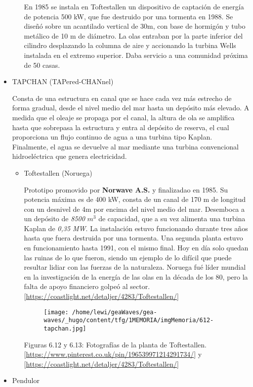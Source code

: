 \documentclass[]{article}
\begin{document}
\begin{itemize}
\begin{itemize}
    En 1985 se instala en Toftestallen un dispositivo de captación de
    energía de potencia 500 kW, que fue destruido por una tormenta en
    1988. Se diseñó sobre un acantilado vertical de 30m, con base de
    hormigón y tubo metálico de 10 m de diámetro. La olas entraban por
    la parte inferior del cilindro desplazando la columna de aire y
    accionando la turbina Wells instalada en el extremo superior. Daba
    servicio a una comunidad próxima de 50 casas.
  \end{itemize}
\item
  TAPCHAN (TAPered-CHANnel)

  Consta de una estructura en canal que se hace cada vez más estrecho de
  forma gradual, desde el nivel medio del mar hasta un depósito más
  elevado. A medida que el oleaje se propaga por el canal, la altura de
  ola se amplifica hasta que sobrepasa la estructura y entra al depósito
  de reserva, el cual proporciona un flujo continuo de agua a una
  turbina tipo Kaplan. Finalmente, el agua se devuelve al mar mediante
  una turbina convencional hidroeléctrica que genera electricidad.

  \begin{itemize}
  \item
    Toftestallen (Noruega)

    Prototipo promovido por \textbf{Norwave A.S.} y finalizadao en 1985.
    Su potencia máxima es de 400 kW, consta de un canal de 170 m de
    longitud con un desnivel de 4m por encima del nivel medio del mar.
    Desemboca a un depósito de \emph{8500} \(m^3\) de capacidad, que a
    su vez alimenta una turbina Kaplan de \emph{0,35 MW}. La instalación
    estuvo funcionando durante tres años hasta que fuera destruida por
    una tormenta. Una segunda planta estuvo en funcionamiento hasta
    1991, con el mismo final. Hoy en día solo quedan las ruinas de lo
    que fueron, siendo un ejemplo de lo difícil que puede resultar
    lidiar con las fuerzas de la naturaleza. Noruega fué líder mundial
    en la investigación de la energía de las olas en la década de los
    80, pero la falta de apoyo financiero golpeó al sector.
    {[}\url{https://coastlight.net/detaljer/4283/Toftestallen/}{]}

    \begin{figure}
    \centering
    \texttt{[image: /home/lewi/geaWaves/gea-waves/\_hugo/content/tfg/1MEMORIA/imgMemoria/612-tapchan.jpg]}
    \caption{}
    \end{figure}

    Figuras 6.12 y 6.13: Fotografías de la planta de Toftestallen.
    {[}\url{https://www.pinterest.co.uk/pin/196539971214291734/}{]} y
    {[}\url{https://coastlight.net/detaljer/4283/Toftestallen/}{]}
  \end{itemize}
\item
  Pendulor


\end{itemize}
\end{document}
